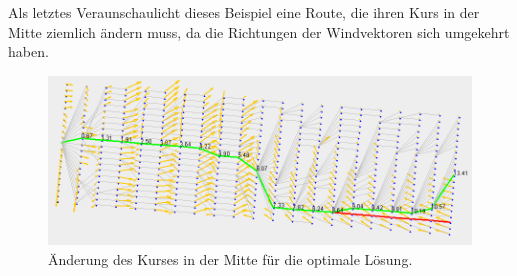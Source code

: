 Als letztes Veraunschaulicht dieses Beispiel eine Route, die ihren Kurs in der Mitte ziemlich ändern muss, da die Richtungen der Windvektoren sich umgekehrt haben. 

\begin{figure}[h!]
\centering
\includegraphics[width=0.8\linewidth]{img/gridNet_20}
\caption{Änderung des Kurses in der Mitte für die optimale Lösung.}
\label{gridnet1}
\end{figure}